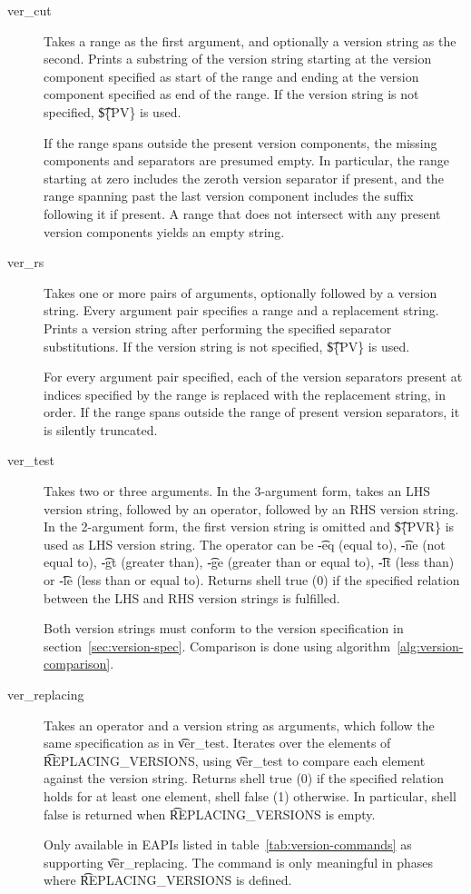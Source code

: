 \begin{description}
\item[ver_cut] Takes a range as the first argument, and optionally a version string as the second.
    Prints a substring of the version string starting at the version component specified as start
    of the range and ending at the version component specified as end of the range. If the version
    string is not specified, \t{\$\{PV\}} is used.

    If the range spans outside the present version components, the missing components and separators
    are presumed empty. In particular, the range starting at zero includes the zeroth version
    separator if present, and the range spanning past the last version component includes the suffix
    following it if present. A range that does not intersect with any present version components
    yields an empty string.

\item[ver_rs] Takes one or more pairs of arguments, optionally followed by a version string.
    Every argument pair specifies a range and a replacement string. Prints a version string after
    performing the specified separator substitutions. If the version string is not specified,
    \t{\$\{PV\}} is used.

    For every argument pair specified, each of the version separators present at indices specified
    by the range is replaced with the replacement string, in order. If the range spans outside
    the range of present version separators, it is silently truncated.

\item[ver_test] Takes two or three arguments. In the 3-argument form, takes an LHS version string,
    followed by an operator, followed by an RHS version string. In the 2-argument form, the first
    version string is omitted and \t{\$\{PVR\}} is used as LHS version string. The operator can be
    \t{-eq} (equal to), \t{-ne} (not equal to), \t{-gt} (greater than), \t{-ge} (greater than or
    equal to), \t{-lt} (less than) or \t{-le} (less than or equal to). Returns shell true (0) if
    the specified relation between the LHS and RHS version strings is fulfilled.

    Both version strings must conform to the version specification in
    section~\ref{sec:version-spec}. Comparison is done using algorithm~\ref{alg:version-comparison}.

\item[ver_replacing]  Takes an operator and a version string as
    arguments, which follow the same specification as in \t{ver_test}. Iterates over the elements
    of \t{REPLACING_VERSIONS}, using \t{ver_test} to compare each element against the version
    string. Returns shell true (0) if the specified relation holds for at least one element,
    shell false (1) otherwise. In particular, shell false is returned when \t{REPLACING_VERSIONS}
    is empty.

    Only available in EAPIs listed in table~\ref{tab:version-commands} as supporting
    \t{ver_replacing}. The command is only meaningful in phases where \t{REPLACING_VERSIONS} is
    defined.
\end{description}

